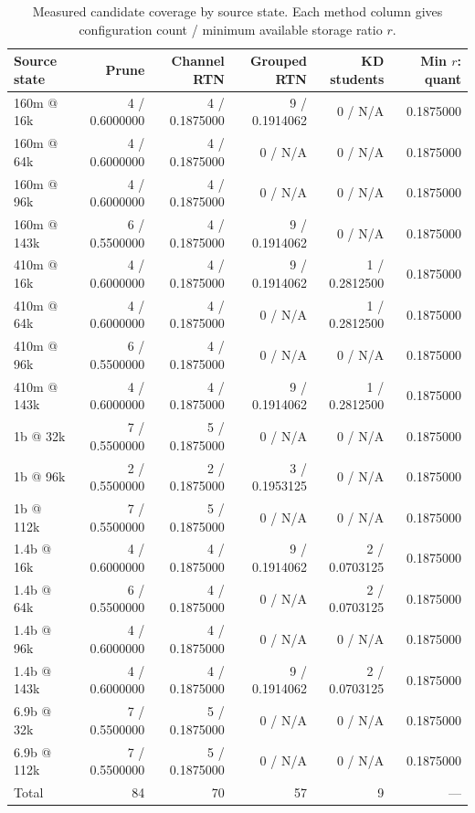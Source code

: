\begin{table}[H]
\centering
\small
\setlength{\tabcolsep}{3pt}
\caption{Measured candidate coverage by source state. Each method column gives configuration count / minimum available storage ratio $r$.}
\label{tab:candidate-coverage}
\begin{tabular}{lrrrrr}
\toprule
Source state & Prune & Channel RTN & Grouped RTN & KD students & Min $r$: quant \\
\midrule
160m @ 16k & 4 / 0.6000000 & 4 / 0.1875000 & 9 / 0.1914062 & 0 / N/A & 0.1875000 \\
160m @ 64k & 4 / 0.6000000 & 4 / 0.1875000 & 0 / N/A & 0 / N/A & 0.1875000 \\
160m @ 96k & 4 / 0.6000000 & 4 / 0.1875000 & 0 / N/A & 0 / N/A & 0.1875000 \\
160m @ 143k & 6 / 0.5500000 & 4 / 0.1875000 & 9 / 0.1914062 & 0 / N/A & 0.1875000 \\
410m @ 16k & 4 / 0.6000000 & 4 / 0.1875000 & 9 / 0.1914062 & 1 / 0.2812500 & 0.1875000 \\
410m @ 64k & 4 / 0.6000000 & 4 / 0.1875000 & 0 / N/A & 1 / 0.2812500 & 0.1875000 \\
410m @ 96k & 6 / 0.5500000 & 4 / 0.1875000 & 0 / N/A & 0 / N/A & 0.1875000 \\
410m @ 143k & 4 / 0.6000000 & 4 / 0.1875000 & 9 / 0.1914062 & 1 / 0.2812500 & 0.1875000 \\
1b @ 32k & 7 / 0.5500000 & 5 / 0.1875000 & 0 / N/A & 0 / N/A & 0.1875000 \\
1b @ 96k & 2 / 0.5500000 & 2 / 0.1875000 & 3 / 0.1953125 & 0 / N/A & 0.1875000 \\
1b @ 112k & 7 / 0.5500000 & 5 / 0.1875000 & 0 / N/A & 0 / N/A & 0.1875000 \\
1.4b @ 16k & 4 / 0.6000000 & 4 / 0.1875000 & 9 / 0.1914062 & 2 / 0.0703125 & 0.1875000 \\
1.4b @ 64k & 6 / 0.5500000 & 4 / 0.1875000 & 0 / N/A & 2 / 0.0703125 & 0.1875000 \\
1.4b @ 96k & 4 / 0.6000000 & 4 / 0.1875000 & 0 / N/A & 0 / N/A & 0.1875000 \\
1.4b @ 143k & 4 / 0.6000000 & 4 / 0.1875000 & 9 / 0.1914062 & 2 / 0.0703125 & 0.1875000 \\
6.9b @ 32k & 7 / 0.5500000 & 5 / 0.1875000 & 0 / N/A & 0 / N/A & 0.1875000 \\
6.9b @ 112k & 7 / 0.5500000 & 5 / 0.1875000 & 0 / N/A & 0 / N/A & 0.1875000 \\
\midrule
Total & 84 & 70 & 57 & 9 & --- \\

\end{tabular}
\end{table}
